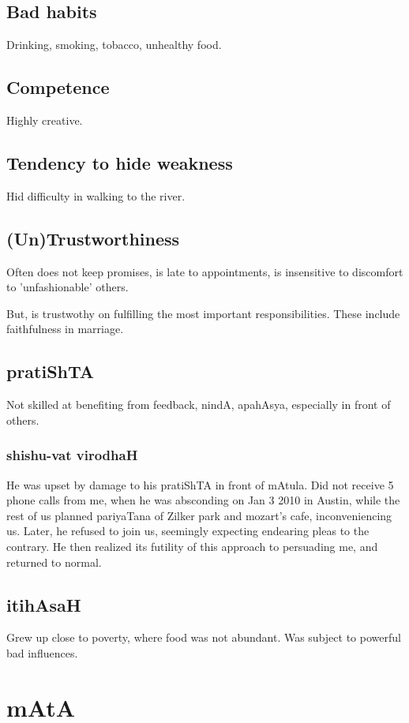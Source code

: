 \documentclass[oneside, article]{memoir}
\begin{document}
\section{Bad habits}
Drinking, smoking, tobacco, unhealthy food.

\section{Competence}
Highly creative.

\section{Tendency to hide weakness}
Hid difficulty in walking to the river.

\section{(Un)Trustworthiness}
Often does not keep promises, is late to appointments, is insensitive to discomfort to 'unfashionable' others.

But, is trustwothy on fulfilling the most important responsibilities. These include faithfulness in marriage.

\section{pratiShTA}
Not skilled at benefiting from feedback, nindA, apahAsya, especially in front of others.

\subsection{shishu-vat virodhaH}
He was upset by damage to his pratiShTA in front of mAtula. Did not receive 5 phone calls from me, when he was absconding on Jan 3 2010 in Austin, while the rest of us planned pariyaTana of Zilker park and mozart's cafe, inconveniencing us. Later, he refused to join us, seemingly expecting endearing pleas to the contrary. He then realized its futility of this approach to persuading me, and returned to normal.

\section{itihAsaH}
Grew up close to poverty, where food was not abundant. Was subject to powerful bad influences.

\chapter{mAtA}
\end{document}
